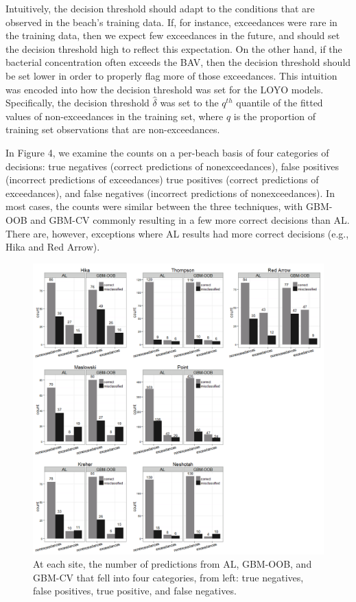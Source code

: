 \documentclass[authoryear,review, 12pt]{elsarticle}
\begin{document}
Intuitively, the decision threshold should adapt to the conditions that
are observed in the beach's training data. If, for instance, exceedances
were rare in the training data, then we expect few exceedances in the
future, and should set the decision threshold high to reflect this
expectation. On the other hand, if the bacterial concentration often
exceeds the BAV, then the decision threshold should be set lower in
order to properly flag more of those exceedances. This intuition was
encoded into how the decision threshold was set for the LOYO models.
Specifically, the decision threshold \(\hat{\delta}\) was set to the
\(q^{th}\) quantile of the fitted values of non-exceedances in the
training set, where \(q\) is the proportion of training set observations
that are non-exceedances.

In Figure 4, we examine the counts on a per-beach basis of four
categories of decisions: true negatives (correct predictions of
nonexceedances), false positives (incorrect predictions of exceedances)
true positives (correct predictions of exceedances), and false negatives
(incorrect predictions of nonexceedances). In most cases, the counts
were similar between the three techniques, with GBM-OOB and GBM-CV
commonly resulting in a few more correct decisions than AL. There are,
however, exceptions where AL results had more correct decisions (e.g.,
Hika and Red Arrow).

\begin{figure}[htbp]
\centering
\includegraphics{figure/counts-barcharts.png}
\caption{At each site, the number of predictions from AL, GBM-OOB, and
GBM-CV that fell into four categories, from left: true negatives, false
positives, true positive, and false negatives.}
\end{figure}
\end{document}
